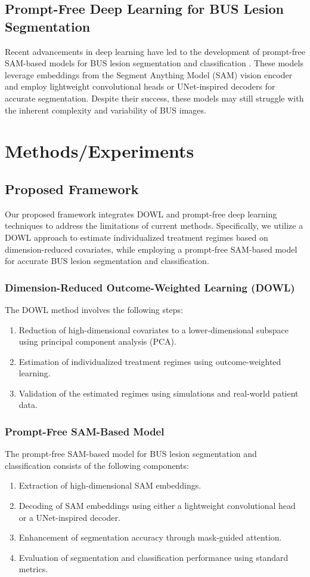 \documentclass[12pt]{article}
\begin{document}
\subsection{Prompt-Free Deep Learning for BUS Lesion Segmentation}
Recent advancements in deep learning have led to the development of prompt-free SAM-based models for BUS lesion segmentation and classification \cite{johnny2026promptfreesambasedmultitaskframework}. These models leverage embeddings from the Segment Anything Model (SAM) vision encoder and employ lightweight convolutional heads or UNet-inspired decoders for accurate segmentation. Despite their success, these models may still struggle with the inherent complexity and variability of BUS images.

\section{Methods/Experiments}
\subsection{Proposed Framework}
Our proposed framework integrates DOWL and prompt-free deep learning techniques to address the limitations of current methods. Specifically, we utilize a DOWL approach to estimate individualized treatment regimes based on dimension-reduced covariates, while employing a prompt-free SAM-based model for accurate BUS lesion segmentation and classification.

\subsubsection{Dimension-Reduced Outcome-Weighted Learning (DOWL)}
The DOWL method involves the following steps:
\begin{enumerate}
    \item Reduction of high-dimensional covariates to a lower-dimensional subspace using principal component analysis (PCA).
    \item Estimation of individualized treatment regimes using outcome-weighted learning.
    \item Validation of the estimated regimes using simulations and real-world patient data.
\end{enumerate}

\subsubsection{Prompt-Free SAM-Based Model}
The prompt-free SAM-based model for BUS lesion segmentation and classification consists of the following components:
\begin{enumerate}
    \item Extraction of high-dimensional SAM embeddings.
    \item Decoding of SAM embeddings using either a lightweight convolutional head or a UNet-inspired decoder.
    \item Enhancement of segmentation accuracy through mask-guided attention.
    \item Evaluation of segmentation and classification performance using standard metrics.
\end{enumerate}
\end{document}
